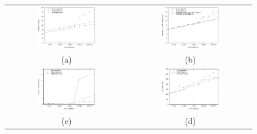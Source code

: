 \documentclass[acmtocl]{acmtrans2m}
\begin{document}
\begin{figure}
\centering
\begin{tabular}{cc}
\includegraphics[width=0.5\textwidth]{plots/mergesort_branches_per_key.eps} & \includegraphics[width=0.5\textwidth]{plots/mergesort_branch_misses.eps} \\
(a) & (b) \\
\includegraphics[width=0.5\textwidth]{plots/mergesort_level_2_misses.eps} & \includegraphics[width=0.5\textwidth]{plots/mergesort_cycle_counts.eps} \\
(c) & (d) \\
\end{tabular}

\end{figure}
\end{document}
